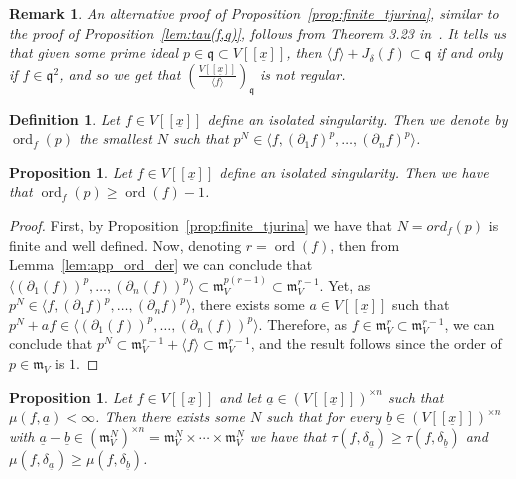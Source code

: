\documentclass{article}
\newtheorem{definition}[theorem]{Definition}
\newtheorem{proposition}[theorem]{Proposition}
\newtheorem{remark}[theorem]{Remark}
\DeclareMathOperator{\ord}{ord}
\newcommand{\maxV}{\mathfrak{m}_V}
\newcommand{\Vx}{V[[\underline{x}]]}
\numberwithin{theorem}{section}
\begin{document}
\begin{remark}
    \textup{An alternative proof of Proposition~\ref{prop:finite_tjurina}, similar to the proof of Proposition~\ref{lem:tau(f,q)}, follows from Theorem 3.23 in~\cite{de2020zariski}. It tells us that given some prime ideal $p \in \mathfrak{q} \subset \Vx$, then $\langle f \rangle + J_\delta\left(f\right) \subset \mathfrak{q}$ if and only if $f \in \mathfrak{q}^2$, and so we get that $\left(\frac{\Vx}{\langle f \rangle}\right)_{\mathfrak{q}}$ is not regular. }
\end{remark}

\begin{definition}
    Let $f \in \Vx$ define an isolated singularity. Then we denote by $\ord_{f}\left(p\right)$ the smallest $N$ such that $p^N \in \langle  f, \left(\partial_1 f\right)^p, \dots, \left(\partial_n f\right)^p \rangle$.  
\end{definition}


\begin{proposition}
    Let $f \in \Vx$ define an isolated singularity. Then we have that $\ord_{f}\left(p\right) \geq  \ord\left(f\right) -1$. 
\end{proposition}

\begin{proof}
First, by Proposition~\ref{prop:finite_tjurina} we have that $N=ord_{f}\left(p\right)$ is finite and well defined. Now, denoting $r=\ord\left(f\right)$, then from Lemma~\ref{lem:app_ord_der} we can conclude that $\langle \left(\partial_1 \left(f\right)\right)^p, \dots, \left(\partial_n \left(f\right)\right)^p \rangle   \subset \maxV^{p\left(r-1\right)} \subset \maxV^{r-1}$. Yet, as $p^N \in \langle  f, \left(\partial_1 f\right)^p, \dots, \left(\partial_n f\right)^p \rangle$,  there exists some $a \in \Vx$ such that $p^N + af \in \langle \left(\partial_1 \left(f\right)\right)^p, \dots, \left(\partial_n \left(f\right)\right)^p \rangle$. Therefore, as $f \in \maxV^r \subset \maxV^{r-1}$, we can conclude that $p^N \subset \maxV^{r-1} + \langle f \rangle \subset \maxV^{r-1}$, and the result follows since the order of $p \in \maxV$ is $1$. 
\end{proof}


\begin{proposition}\label{thm:constant_delta}
    Let $f \in \Vx$ and let $\underline{a} \in (\Vx)^{ \times n}$ such that $\mu(f, \underline{a}) < \infty$. Then there exists some $N$ such that for every $\underline{b} \in (\Vx)^{\times n}$ with $\underline{a} - \underline{b} \in (\maxV^N)^{\times n}=\maxV^N \times \cdots \times \maxV^N$ we have that $\tau(f, \delta_{\underline{a}}) \geq\tau(f, \delta_{\underline{b}})$ and $\mu(f, \delta_{\underline{a}}) \geq\mu(f, \delta_{\underline{b}})$. 
\end{proposition}
\end{document}
